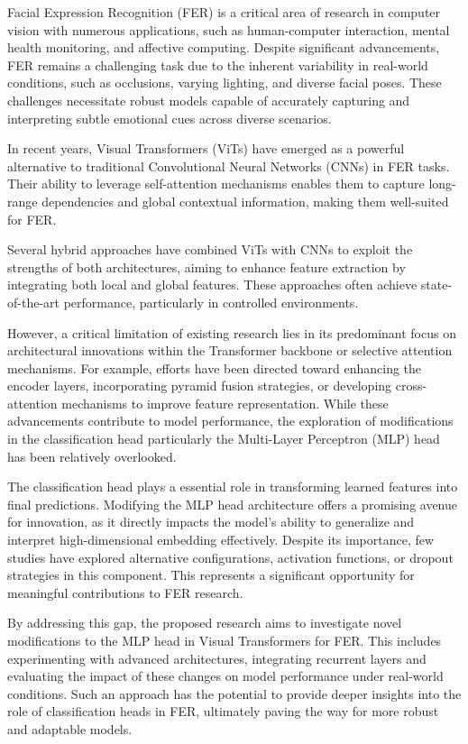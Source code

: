 Facial Expression Recognition (FER) is a critical area of research in computer vision with numerous applications, such as human-computer interaction, mental health monitoring, and affective computing. Despite significant advancements, FER remains a challenging task due to the inherent variability in real-world conditions, such as occlusions, varying lighting, and diverse facial poses. These challenges necessitate robust models capable of accurately capturing and interpreting subtle emotional cues across diverse scenarios.

In recent years, Visual Transformers (ViTs) have emerged as a powerful alternative to traditional Convolutional Neural Networks (CNNs) in FER tasks. Their ability to leverage self-attention mechanisms enables them to capture long-range dependencies and global contextual information, making them well-suited for FER. 

Several hybrid approaches have combined ViTs with CNNs to exploit the strengths of both architectures, aiming to enhance feature extraction by integrating both local and global features. These approaches often achieve state-of-the-art performance, particularly in controlled environments.

However, a critical limitation of existing research lies in its predominant focus on architectural innovations within the Transformer backbone or selective attention mechanisms. For example, efforts have been directed toward enhancing the encoder layers, incorporating pyramid fusion strategies, or developing cross-attention mechanisms to improve feature representation. While these advancements contribute to model performance, the exploration of modifications in the classification head particularly the Multi-Layer Perceptron (MLP) head has been relatively overlooked.

The classification head plays a essential role in transforming learned features into final predictions. Modifying the MLP head architecture offers a promising avenue for innovation, as it directly impacts the model's ability to generalize and interpret high-dimensional embedding effectively. Despite its importance, few studies have explored alternative configurations, activation functions, or dropout strategies in this component. This represents a significant opportunity for meaningful contributions to FER research.

By addressing this gap, the proposed research aims to investigate novel modifications to the MLP head in Visual Transformers for FER. This includes experimenting with advanced architectures, integrating recurrent layers and evaluating the impact of these changes on model performance under real-world conditions. Such an approach has the potential to provide deeper insights into the role of classification heads in FER, ultimately paving the way for more robust and adaptable models.



